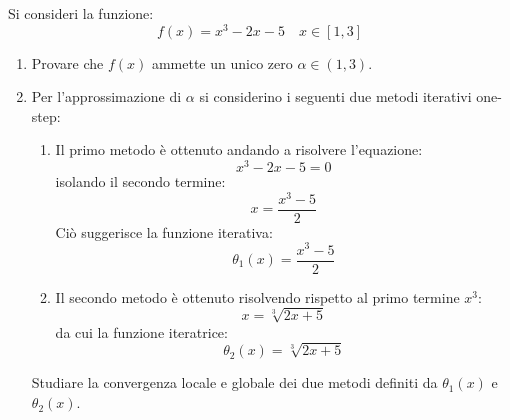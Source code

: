 \documentclass[12pt]{report}
\newcounter{exercise}
\begin{document}
\begin{exercise}{}{}
	Si consideri la funzione:
	\[
	f(x) = x^3 - 2x - 5 \quad x \in [1, 3]
	\]
	\begin{enumerate}
		\item Provare che $f(x)$ ammette un unico zero $\alpha \in (1, 3)$.
		\item Per l'approssimazione di $\alpha$ si considerino i seguenti due metodi iterativi one-step:
		\begin{enumerate}
			\item Il primo metodo è ottenuto andando a risolvere l'equazione:
			\[
			x^3 - 2x - 5 = 0
			\]
			isolando il secondo termine:
			\[
			x = \frac{x^3 - 5}{2}
			\]
			Ciò suggerisce la funzione iterativa:
			\[
			\theta_1(x) = \frac{x^3 - 5}{2}
			\]
			\item Il secondo metodo è ottenuto risolvendo rispetto al primo termine $x^3$:
			\[
			x = \sqrt[3]{2x + 5}
			\]
			da cui la funzione iteratrice:
			\[
			\theta_2(x) = \sqrt[3]{2x + 5}
			\]
		\end{enumerate}
		Studiare la convergenza locale e globale dei due metodi definiti da $\theta_1(x)$ e $\theta_2(x)$.


\end{enumerate}
\end{exercise}
\end{document}
